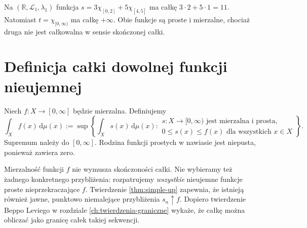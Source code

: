 \begin{przyklad}
Na $(\mathbb R,\mathcal L_1,\lambda_1)$ funkcja
$s=3\chi_{[0,2]}+5\chi_{[4,5]}$ ma całkę
$3\cdot2+5\cdot1=11$. Natomiast
$t=\chi_{[0,\infty)}$ ma całkę $+\infty$.
Obie funkcje są proste i mierzalne, chociaż druga
nie jest całkowalna w sensie skończonej całki.
\end{przyklad}

\section{Definicja całki dowolnej funkcji nieujemnej}

\begin{definicja}
\label{def:integral-positive}
Niech $f:X\to[0,\infty]$ będzie mierzalna. Definiujemy
\begin{equation}\label{eq:positive-integral}
\int_X f(x)\,\mathrm d\mu(x)
:=\sup\left\{\int_X s(x)\,\mathrm d\mu(x):
\begin{array}{l}
 s:X\to[0,\infty)\text{ jest mierzalna i prosta},\\[-2pt]
 0\le s(x)\le f(x)\text{ dla wszystkich }x\in X
\end{array}\right\}.
\end{equation}
Supremum należy do $[0,\infty]$. Rodzina funkcji
prostych w nawiasie jest niepusta, ponieważ zawiera zero.
\end{definicja}

\begin{uwaga}
Mierzalność funkcji $f$ nie wymusza skończoności całki.
Nie wybieramy też żadnego konkretnego przybliżenia:
rozpatrujemy \emph{wszystkie} nieujemne funkcje proste
nieprzekraczające $f$. Twierdzenie
\ref{thm:simple-up} zapewnia, że istnieją również
jawne, punktowo niemalejące przybliżenia $s_n\uparrow f$.
Dopiero twierdzenie Beppo Leviego w rozdziale
\ref{ch:twierdzenia-graniczne} wykaże, że całkę można
obliczać jako granicę całek takiej sekwencji.
\end{uwaga}


